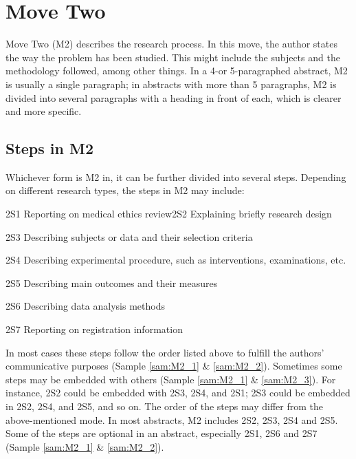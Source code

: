 \documentclass{ctexbook}
\begin{document}
\chapter{Move Two}\label{chapter4}

Move Two (M2) describes the research process. In this move, the author states the way the problem has been studied. This might include the subjects and the methodology followed, among other things. In a 4-or 5-paragraphed abstract, M2 is usually a single paragraph; in abstracts with more than 5 paragraphs, M2 is divided into several paragraphs with a heading in front of each, which is clearer and more specific.

\section{Steps in M2}

Whichever form is M2 in, it can be further divided into several steps. Depending on different research types, the steps in M2 may include:

2S1 Reporting on medical ethics review2S2 Explaining briefly research design

2S3 Describing subjects or data and their selection criteria

2S4 Describing experimental procedure, such as interventions, examinations, etc.

2S5 Describing main outcomes and their measures

2S6 Describing data analysis methods

2S7 Reporting on registration information 

In most cases these steps follow the order listed above to fulfill the authors' communicative purposes (Sample \ref{sam:M2_1} \& \ref{sam:M2_2}). Sometimes some steps may be embedded with others (Sample \ref{sam:M2_1} \& \ref{sam:M2_3}). For instance, 2S2 could be embedded with 2S3, 2S4, and 2S1; 2S3 could be embedded in 2S2, 2S4, and 2S5, and so on. The order of the steps may differ from the above-mentioned mode. In most abstracts, M2 includes 2S2, 2S3, 2S4 and 2S5. Some of the steps are optional in an abstract, especially 2S1, 2S6 and 2S7 (Sample \ref{sam:M2_1} \& \ref{sam:M2_2}).
\end{document}
